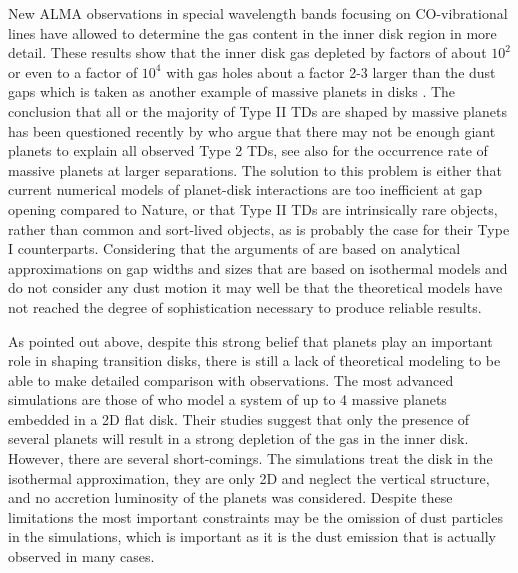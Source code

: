 \documentclass[10pt,fleqn,twoside]{article}
\begin{document}
New ALMA observations in special wavelength bands focusing on CO-vibrational lines have allowed
to determine the gas content in the inner disk region in more detail. These results show that 
the inner disk gas depleted by factors of about $10^{2}$ \citep{2015A&A...579A.106V} or even to a factor
of $10^{4}$ with gas holes about a factor 2-3 larger than the dust gaps \citep{2016A&A...585A..58V}
which is taken as another example of massive planets in disks \citep{2016Natur.530..169H}.
The conclusion that all or the majority of Type II TDs are shaped by massive planets has been
questioned recently by \citet{2016ApJ...825...77D} who argue that
there may not be enough giant planets to explain all observed Type 2 TDs, see also \citet{2008PASP..120..531C}
for the occurrence rate of massive planets at larger separations.
The solution to this problem is either that current numerical 
models of planet-disk interactions are too inefficient at gap opening compared to Nature, 
or that Type II TDs are intrinsically rare objects, rather than common and sort-lived objects, 
as is probably the case for their Type I counterparts. Considering that the arguments
of \citet{2016ApJ...825...77D} are based on analytical approximations on gap widths and sizes that
are based on isothermal models and do not consider any dust motion it may well be that the theoretical models
have not reached the degree of sophistication necessary to produce reliable results.

As pointed out above,  
despite this strong belief that planets play an important role in shaping transition disks, there
is still a lack of theoretical modeling to be able to make detailed comparison with observations.
The most advanced simulations are those of \citet{2011ApJ...729...47Z} who model a system of up to 4 massive planets embedded
in a 2D flat disk. Their studies suggest that only the presence of several planets will result in a
strong depletion of the gas in the inner disk. However, there are several short-comings. The simulations treat the disk in the
isothermal approximation, they are only 2D and neglect the vertical structure, and no accretion luminosity of the
planets was considered. Despite these limitations the most important constraints may be the omission of
dust particles in the simulations, which is important as it is the dust emission that is actually observed
in many cases.
\end{document}
